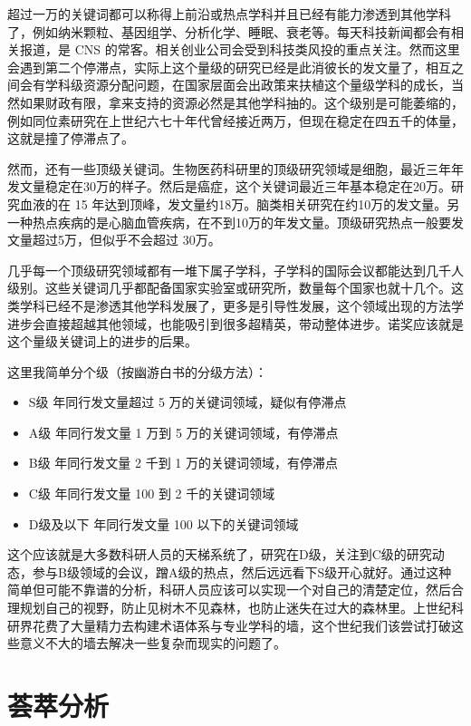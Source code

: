 \documentclass[]{tufte-book}
\providecommand{\tightlist}{%
  \setlength{\itemsep}{0pt}\setlength{\parskip}{0pt}}
\begin{document}
超过一万的关键词都可以称得上前沿或热点学科并且已经有能力渗透到其他学科了，例如纳米颗粒、基因组学、分析化学、睡眠、衰老等。每天科技新闻都会有相关报道，是 CNS 的常客。相关创业公司会受到科技类风投的重点关注。然而这里会遇到第二个停滞点，实际上这个量级的研究已经是此消彼长的发文量了，相互之间会有学科级资源分配问题，在国家层面会出政策来扶植这个量级学科的成长，当然如果财政有限，拿来支持的资源必然是其他学科抽的。这个级别是可能萎缩的，例如同位素研究在上世纪六七十年代曾经接近两万，但现在稳定在四五千的体量，这就是撞了停滞点了。

然而，还有一些顶级关键词。生物医药科研里的顶级研究领域是细胞，最近三年年发文量稳定在30万的样子。然后是癌症，这个关键词最近三年基本稳定在20万。研究血液的在 15 年达到顶峰，发文量约18万。脑类相关研究在约10万的发文量。另一种热点疾病的是心脑血管疾病，在不到10万的年发文量。顶级研究热点一般要发文量超过5万，但似乎不会超过 30万。

几乎每一个顶级研究领域都有一堆下属子学科，子学科的国际会议都能达到几千人级别。这些关键词几乎都配备国家实验室或研究所，数量每个国家也就十几个。这类学科已经不是渗透其他学科发展了，更多是引导性发展，这个领域出现的方法学进步会直接超越其他领域，也能吸引到很多超精英，带动整体进步。诺奖应该就是这个量级关键词上的进步的后果。

这里我简单分个级（按幽游白书的分级方法）：

\begin{itemize}
\tightlist
\item
  S级 年同行发文量超过 5 万的关键词领域，疑似有停滞点
\item
  A级 年同行发文量 1 万到 5 万的关键词领域，有停滞点
\item
  B级 年同行发文量 2 千到 1 万的关键词领域，有停滞点
\item
  C级 年同行发文量 100 到 2 千的关键词领域
\item
  D级及以下 年同行发文量 100 以下的关键词领域
\end{itemize}

这个应该就是大多数科研人员的天梯系统了，研究在D级，关注到C级的研究动态，参与B级领域的会议，蹭A级的热点，然后远远看下S级开心就好。通过这种简单但可能不靠谱的分析，科研人员应该可以实现一个对自己的清楚定位，然后合理规划自己的视野，防止见树木不见森林，也防止迷失在过大的森林里。上世纪科研界花费了大量精力去构建术语体系与专业学科的墙，这个世纪我们该尝试打破这些意义不大的墙去解决一些复杂而现实的问题了。

\hypertarget{ux835fux8403ux5206ux6790}{%
\section{荟萃分析}\label{ux835fux8403ux5206ux6790}}
\end{document}
